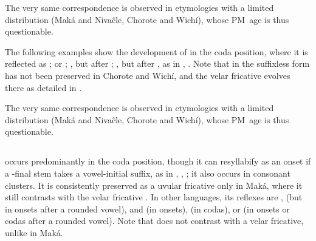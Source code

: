 \begin{exe}
    \ex \mouth
    \ex \truev
    \ex \arrowkaxe
    \ex \price
    \ex \night
    \ex \egg
    \ex \headn
    \ex \jelayuk
    \ex \vrbpl
    \ex \recipient
    \ex \tuscaf \label{x-tuscaf}
    \ex \tuscat
    \ex \tuscag \label{x-tuscag}
    \ex \grass
    \ex \maguari
\end{exe}

The very same correspondence is observed in etymologies with a limited distribution (Maká and Nivaĉle, Chorote and Wichí), whose PM~age is thus questionable.

\begin{exe}
    \ex \ameiva
    \ex \ocelot
    \ex \dirt
    \ex \palocruzmn
\end{exe}

The following examples show the development of  in the coda position, where it is reflected as ;  or ; , but  after  ; , but  after , as in , . Note that in  the suffixless form has not been preserved in Chorote and Wichí, and the velar fricative evolves there as detailed in .

\begin{exe}
    \ex \bite
    \ex \cutdown
    \ex \rightn
    \ex \fieldn
    \ex \finger \label{finger-xw}
    \ex \youngerbro
    \ex \wash
    \ex \bow
    \ex \languageword
    \ex \nose \label{nose-x}
    \ex \smelln
    \ex \pathn
    \ex \thunder
    \ex \abdcavity
    \ex \carrysh
    \ex \dig
    \ex \eatvt \label{eatvt-xw}
    \ex \aunt
    \ex \burrow
    \ex \skin
\end{exe}

The very same correspondence is observed in etymologies with a limited distribution (Maká and Nivaĉle, Chorote and Wichí), whose PM~age is thus questionable.

\begin{exe}
    \ex \foodmn
    \ex \hole
    \ex \leafmn
    \ex \saymn
    \ex \stagnant
\end{exe}

\subsection{}\label{proto-jj}
 occurs predominantly in the coda position, though it can resyllabify as an onset if a \mbox{-}final stem takes a vowel-initial suffix, as in , , ; it also occurs in consonant clusters. It is consistently preserved as a uvular fricative only in Maká, where it still contrasts with the velar fricative . In other languages, its reflexes are ,  (but  in onsets after a rounded vowel), and  (in onsets),  (in codas), or  (in onsets or codas after a rounded vowel). Note that  does not contrast with a velar fricative, unlike in Maká.

